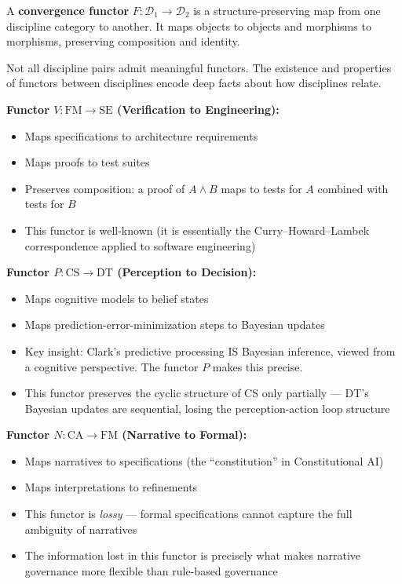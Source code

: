 \documentclass[11pt,a4paper]{article}
\begin{document}
A \textbf{convergence functor} $F: \mathcal{D}_1 \to \mathcal{D}_2$ is a structure-preserving map from one discipline category to another. It maps objects to objects and morphisms to morphisms, preserving composition and identity.

Not all discipline pairs admit meaningful functors. The existence and properties of functors between disciplines encode deep facts about how disciplines relate.

\textbf{Functor $V: \mathrm{FM} \to \mathrm{SE}$ (Verification to Engineering):}
\begin{itemize}
    \item Maps specifications to architecture requirements
    \item Maps proofs to test suites
    \item Preserves composition: a proof of $A \wedge B$ maps to tests for $A$ combined with tests for $B$
    \item This functor is well-known (it is essentially the Curry--Howard--Lambek correspondence applied to software engineering)
\end{itemize}

\textbf{Functor $P: \mathrm{CS} \to \mathrm{DT}$ (Perception to Decision):}
\begin{itemize}
    \item Maps cognitive models to belief states
    \item Maps prediction-error-minimization steps to Bayesian updates
    \item Key insight: Clark's \cite{clark2013} predictive processing IS Bayesian inference, viewed from a cognitive perspective. The functor $P$ makes this precise.
    \item This functor preserves the cyclic structure of CS only partially --- DT's Bayesian updates are sequential, losing the perception-action loop structure
\end{itemize}

\textbf{Functor $N: \mathrm{CA} \to \mathrm{FM}$ (Narrative to Formal):}
\begin{itemize}
    \item Maps narratives to specifications (the ``constitution'' in Constitutional AI)
    \item Maps interpretations to refinements
    \item This functor is \emph{lossy} --- formal specifications cannot capture the full ambiguity of narratives
    \item The information lost in this functor is precisely what makes narrative governance more flexible than rule-based governance
\end{itemize}
\end{document}
